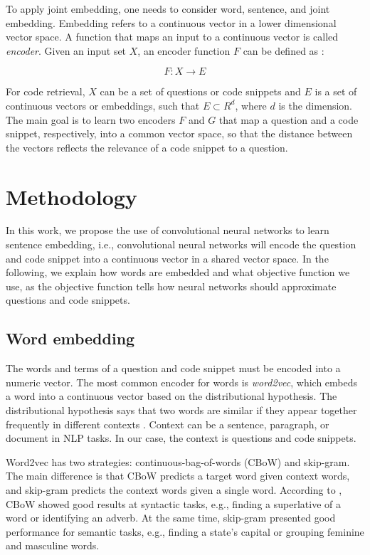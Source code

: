 \documentclass[sigconf]{acmart}
\begin{document}
To apply joint embedding, one needs to consider word, sentence, and joint embedding. Embedding refers to a continuous vector in a lower dimensional vector space. A function that maps an input to a continuous vector is called \emph{encoder}. Given an input set $X$, an encoder function $F$ can be defined as \cite{cambronero-deep-code-search-2019}:

\begin{equation}
    F: X \to E
\end{equation}

For code retrieval, $X$ can be a set of questions or code snippets and $E$ is a set of continuous vectors or embeddings, such that $E \subset R^{d}$, where $d$ is the dimension. The main goal is to learn two encoders $F$ and $G$ that map a question and a code snippet, respectively, into a common vector space, so that the distance between the vectors reflects the relevance of a code snippet to a question.


\section{Methodology}
\label{sec:methodology}

In this work, we propose the use of convolutional neural networks to learn sentence embedding, i.e., convolutional neural networks will encode the question and code snippet into a continuous vector in a shared vector space. In the following, we explain how words are embedded and what objective function we use, as the objective function tells how neural networks should approximate questions and code snippets.

\subsection{Word embedding}
\label{sec:word-embedding}

The words and terms of a question and code snippet must be encoded into a numeric vector. The most common encoder for words is \emph{word2vec}, which embeds a word into a continuous vector based on the distributional hypothesis. The distributional hypothesis says that two words are similar if they appear together frequently in different contexts \citep{Goodfellow-et-al-2016}. Context can be a sentence, paragraph, or document in NLP tasks. In our case, the context is questions and code snippets.

Word2vec has two strategies: continuous-bag-of-words (CBoW) and skip-gram. The main difference is that CBoW predicts a target word given context words, and skip-gram predicts the context words given a single word. According to \citet{mikolov2013distributed}, CBoW showed good results at syntactic tasks, e.g., finding a superlative of a word or identifying an adverb. At the same time, skip-gram presented good performance for semantic tasks, e.g., finding a state's capital or grouping feminine and masculine words. 
\end{document}
